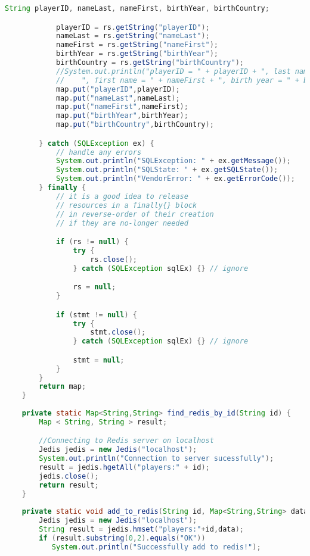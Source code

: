 \documentclass[11pt, oneside]{article}   	%
\begin{document}
\begin{lstlisting}[language=java]
            String playerID, nameLast, nameFirst, birthYear, birthCountry;

            playerID = rs.getString("playerID");
            nameLast = rs.getString("nameLast");
            nameFirst = rs.getString("nameFirst");
            birthYear = rs.getString("birthYear");
            birthCountry = rs.getString("birthCountry");
            //System.out.println("playerID = " + playerID + ", last name = " + nameLast +
            //    ", first name = " + nameFirst + ", birth year = " + birthYear + ", birth Country = " + birthCountry);
            map.put("playerID",playerID);
            map.put("nameLast",nameLast);
            map.put("nameFirst",nameFirst);
            map.put("birthYear",birthYear);
            map.put("birthCountry",birthCountry);

        } catch (SQLException ex) {
            // handle any errors
            System.out.println("SQLException: " + ex.getMessage());
            System.out.println("SQLState: " + ex.getSQLState());
            System.out.println("VendorError: " + ex.getErrorCode());
        } finally {
            // it is a good idea to release
            // resources in a finally{} block
            // in reverse-order of their creation
            // if they are no-longer needed

            if (rs != null) {
                try {
                    rs.close();
                } catch (SQLException sqlEx) {} // ignore

                rs = null;
            }

            if (stmt != null) {
                try {
                    stmt.close();
                } catch (SQLException sqlEx) {} // ignore

                stmt = null;
            }
        }
        return map;
    }
    
    private static Map<String,String> find_redis_by_id(String id) {
        Map < String, String > result;

        //Connecting to Redis server on localhost 
        Jedis jedis = new Jedis("localhost");
        System.out.println("Connection to server sucessfully");
        result = jedis.hgetAll("players:" + id);
        jedis.close();
        return result;
    }
    
    private static void add_to_redis(String id, Map<String,String> data) {
        Jedis jedis = new Jedis("localhost");
        String result = jedis.hmset("players:"+id,data);
        if (result.substring(0,2).equals("OK"))
           System.out.println("Successfully add to redis!");
    

\end{lstlisting}
\end{document}
